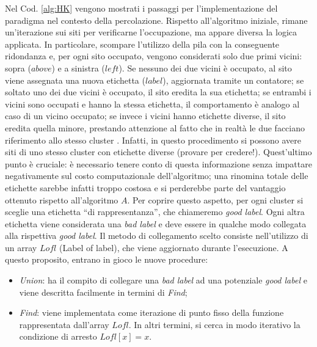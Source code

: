 Nel Cod. \ref{alg:HK} vengono mostrati i passaggi per l'implementazione 
del paradigma nel contesto della percolazione.
Rispetto all'algoritmo iniziale, rimane un'iterazione sui siti per verificarne
l'occupazione, ma appare diversa la logica applicata. In particolare, scompare
l'utilizzo della pila con la conseguente ridondanza e, per 
ogni sito occupato, vengono considerati solo due primi vicini: sopra (\textit{$above$}) 
e a sinistra ($left$). Se nessuno dei due vicini è occupato, al sito 
viene assegnata una nuova etichetta ($label$), aggiornata tramite un contatore;
se soltato uno dei due vicini è occupato, il sito eredita la sua etichetta;
se entrambi i vicini sono occupati e hanno la stessa etichetta, il comportamento
è analogo al caso di un vicino occupato; se invece i vicini hanno etichette diverse, 
il sito eredita quella minore, prestando attenzione al fatto che in realtà 
le due facciano riferimento allo stesso cluster \cite{pseudoHK}.
Infatti, in questo procedimento si possono avere siti di uno 
stesso cluster con etichette diverse (provare per credere!).
Quest'ultimo punto è cruciale: è necessario tenere conto di questa informazione
senza impattare negativamente sul costo computazionale dell'algoritmo; una rinomina
totale delle etichette sarebbe infatti troppo costosa e si perderebbe parte del vantaggio
ottenuto rispetto all'algoritmo $A$.
Per coprire questo aspetto, per ogni cluster si sceglie una etichetta 
``di rappresentanza'', che chiameremo \textit{good label}. Ogni altra etichetta viene 
considerata una \textit{bad label} e deve essere in qualche modo collegata alla rispettiva
\textit{good label}. Il metodo di collegamento scelto consiste nell'utilizzo di un array 
$Lofl$ (Label of label), che viene aggiornato durante l'esecuzione. 
A questo proposito, entrano in gioco le nuove procedure:
\begin{itemize}
    \item \textit{Union}: ha il compito di collegare una \textit{bad label} ad una 
    potenziale\footnotemark{} \textit{good label} e viene descritta facilmente in termini di \textit{Find};
    \item \textit{Find}: viene implementata come iterazione di punto fisso 
        della funzione rappresentata dall'array $Lofl$. In 
        altri termini, si cerca in modo iterativo la condizione di arresto $Lofl[x]=x$.
\end{itemize}

